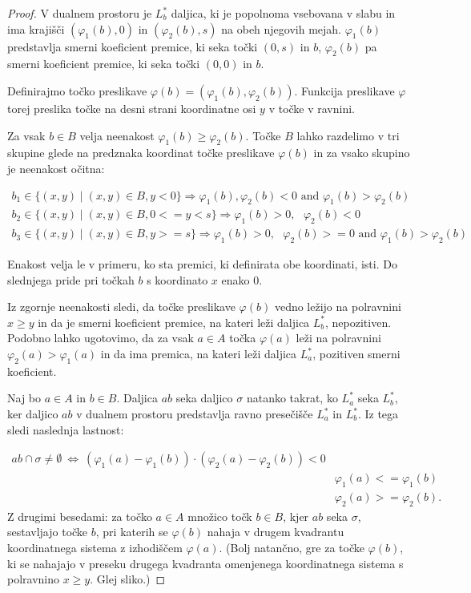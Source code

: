 \documentclass[a4paper, 12pt]{book}
\begin{document}
\begin{proof}
V dualnem prostoru je $L^* _b$ daljica, ki je popolnoma vsebovana v slabu in ima krajišči $(\varphi_1(b),0)$ in $(\varphi_2(b),s)$ na obeh njegovih mejah. $\varphi_1(b)$ predstavlja smerni koeficient premice, ki seka točki $(0,s)$ in $b$, $\varphi_2(b)$ pa smerni koeficient premice, ki seka točki $(0,0)$ in $b$.

Definirajmo točko preslikave $\varphi(b)=(\varphi_1(b),\varphi_2(b))$. Funkcija preslikave $\varphi$ torej preslika točke na desni strani koordinatne osi $y$ v točke v ravnini.

Za vsak $b\in B$ velja neenakost $\varphi_1(b) \geq \varphi_2(b)$. Točke $B$ lahko razdelimo v tri skupine glede na predznaka koordinat točke preslikave $\varphi(b)$ in za vsako skupino je neenakost očitna:

\begin{align*}
    b_1 \in \{ (x,y) \mid (x,y) \in B, y < 0 \} \Rightarrow \varphi_1(b),\varphi_2(b) < 0 \text{ and } \varphi_1(b) > \varphi_2(b) \\
b_2 \in \{ (x,y) \mid (x,y) \in B, 0 <= y < s \} \Rightarrow \varphi_1(b) > 0, \text{ } \varphi_2(b) < 0 \\
    b_3 \in \{ (x,y) \mid (x,y) \in B, y >= s \} \Rightarrow \varphi_1(b) > 0, \text{ } \varphi_2(b) >= 0 \text{ and } \varphi_1(b) > \varphi_2(b)
\end{align*}

Enakost velja le v primeru, ko sta premici, ki definirata obe koordinati, isti. Do slednjega pride pri točkah $b$ s koordinato $x$ enako $0$. 

Iz zgornje neenakosti sledi, da točke preslikave $\varphi(b)$ vedno ležijo na polravnini $x \geq y$ in da je smerni koeficient premice, na kateri leži daljica $L^*_b$, nepozitiven. Podobno lahko ugotovimo, da za vsak $a \in A$ točka $\varphi(a)$ leži na polravnini $\varphi_2(a) > \varphi_1(a)$ in da ima premica, na kateri leži daljica $L^*_a$, pozitiven smerni koeficient.

Naj bo $a \in A$ in $b \in B$. Daljica $ab$ seka daljico $\sigma$ natanko takrat, ko $L^*_a$ seka $L^*_b$, ker daljico $ab$ v dualnem prostoru predstavlja ravno presečišče $L^*_a$ in $L^*_b$. Iz tega sledi naslednja lastnost:

\begin{align*}
		ab \cap \sigma \neq \emptyset ~\Longleftrightarrow ~ 
		(\varphi_1(a)-\varphi_1(b)) \cdot (\varphi_2(a)- \varphi_2(b)) < 0\\
				&	\varphi_1(a) <= \varphi_1(b)\\
				&	\varphi_2(a) >= \varphi_2(b).
\end{align*}
Z drugimi besedami: za točko $a \in A$ množico točk $b \in B$, kjer $ab$ seka $\sigma$, sestavljajo točke $b$, pri katerih se $\varphi(b)$ nahaja v drugem kvadrantu koordinatnega sistema z izhodiščem $\varphi(a)$. (Bolj natančno, gre za točke $\varphi(b)$, ki se nahajajo v preseku drugega kvadranta omenjenega koordinatnega sistema s polravnino $x \geq y$. Glej sliko.)


\end{proof}
\end{document}
